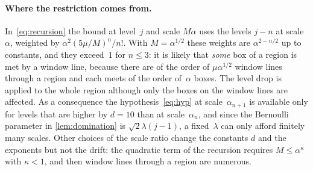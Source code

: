 \documentclass[11pt,letterpaper]{article}
\begin{document}
\paragraph{Where the restriction comes from.} In~\eqref{eq:recursion} the bound at level~$j$ and scale $M\alpha$ uses the levels $j-n$ at scale~$\alpha$, weighted by $\alpha^2(5\mu/M)^n/n!$. With $M=\alpha^{1/2}$ these weights are $\alpha^{2-n/2}$ up to constants, and they exceed~$1$ for $n\le3$: it is likely that \emph{some} box of a region is met by a window line, because there are of the order of $\mu\alpha^{1/2}$ window lines through a region and each meets of the order of~$\alpha$ boxes. The level drop is applied to the whole region although only the boxes on the window lines are affected. As a consequence the hypothesis~\eqref{eq:hyp} at scale~$\alpha_{n+1}$ is available only for levels that are higher by $d=10$ than at scale~$\alpha_n$, and since the Bernoulli parameter in \cref{lem:domination} is $\sqrt2\lambda(j-1)$, a fixed~$\lambda$ can only afford finitely many scales. Other choices of the scale ratio change the constants $d$ and the exponents but not the drift: the quadratic term of the recursion requires $M\le\alpha^{\kappa}$ with $\kappa<1$, and then window lines through a region are numerous.
\end{document}
